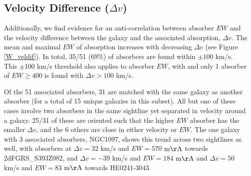 \documentclass[iop]{emulateapj-rtx4}
\begin{document}
\subsection{Velocity Difference \rm($\Delta v$\rm)}

Additionally, we find evidence for an anti-correlation between absorber $EW$ and the velocity difference between the galaxy and the associated absorption, $\Delta v$. The mean and maximal $EW$ of absorption increases with decreasing $\Delta v$ (see Figure \ref{W_veldif}). In total, 35/51 ($69\%$) of absorbers are found within $\pm100$ km/s. This $\pm100$ km/s threshold also applies to absorber $EW$, with and only 1 absorber of $EW \geq 400$ is found with $\Delta v > 100$ km/s. 

Of the 51 associated absorbers, 31 are matched with the same galaxy as another absorber (for a total of 15 unique galaxies in this subset). All but one of these cases involve two absorbers in the same sightline yet separated in velocity around a galaxy. 25/31 of these are oriented such that the higher $EW$ absorber has the smaller $\Delta v$, and the 6 others are close in either velocity or $EW$. The one galaxy with 3 associated absorbers, NGC1097, shows this trend across two sightlines as well, with absorbers at $\Delta v = 32$ km/s and $EW = 570$ $\rm m\AA$ towards 2dFGRS\_S393Z082, and $\Delta v = -39$ km/s and $EW = 184$ $\rm m\AA$ and $\Delta v = 50$ km/s and $EW = 83$ $\rm m\AA$ towards HE0241-3043.

\vspace{5pt}

% 
  
%
%
\end{document}
